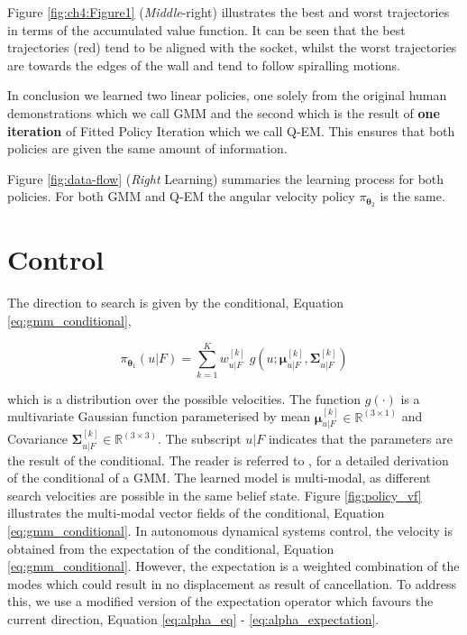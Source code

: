 \documentclass[final,5p,times,twocolumn]{elsarticle}
\newcommand{\SigK}{\boldsymbol{\Sigma}^{[k]}}
\newcommand{\MuK}{\boldsymbol{\mu}^{[k]}}
\newcommand{\xb}{u|F}
\newcommand{\Param}{\boldsymbol{\theta}}
\begin{document}
Figure \ref{fig:ch4:Figure1} (\textit{Middle}-right) illustrates the best and worst trajectories in terms of the accumulated value function.
It can be seen that the best trajectories (red) tend to be aligned with the socket, 
whilst the worst trajectories are towards the edges of the wall and tend to follow spiralling motions. 

In conclusion we learned two linear policies, one solely from the original human demonstrations which we call GMM 
and the second which is the result of \textbf{one iteration} of Fitted Policy Iteration which we call Q-EM. 
This ensures that both policies are given the same amount of information.

Figure \ref{fig:data-flow} (\textit{Right} Learning) summaries the learning process for both policies. For both GMM and Q-EM
the angular velocity policy $\pi_{\Param_2}$ is the same.


\section{Control}\label{sec:control_architecture}

The direction to search is given by the conditional, Equation \ref{eq:gmm_conditional},

\begin{equation}\label{eq:gmm_conditional}
 \pi_{\Param_1}(u\lvert F) = \sum_{k=1}^{K} w^{[k]}_{\xb} \; g(u;\MuK_{\xb},\SigK_{\xb}) 
 \end{equation}

which is a distribution over the possible velocities. The function $g(\cdot)$ is a multivariate
Gaussian function parameterised by mean $\MuK_{\xb} \in \mathbb{R}^{(3\times1)}$ and Covariance 
${\SigK_{\xb} \in \mathbb{R}^{(3\times3)}}$. The subscript $\xb$ indicates that the parameters 
are the result of the conditional. The reader is referred to \cite{gesture_calinon_2010}, \cite{gmr_2004} for 
a detailed derivation of the conditional of a GMM. The learned model 
is multi-modal, as different search velocities are possible 
in the same belief state. Figure \ref{fig:policy_vf} illustrates the multi-modal 
vector fields of the conditional, Equation \ref{eq:gmm_conditional}.
In autonomous dynamical systems control, the velocity is obtained from 
the expectation of the conditional, Equation \ref{eq:gmm_conditional}. However, the expectation is a weighted 
combination of the modes which could result in no displacement as result of cancellation.
To address this, we use a modified version of the expectation operator which favours the current
direction, Equation \ref{eq:alpha_eq} - \ref{eq:alpha_expectation}.
\end{document}
